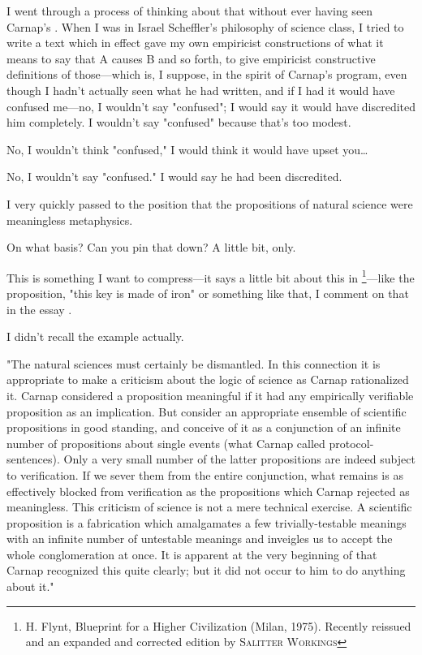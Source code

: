 I went through a process of thinking about that without ever 
having seen Carnap's . When I 
was in Israel Scheffler's philosophy of science class, I tried to write a 
text which in effect gave my own empiricist constructions of what it 
means to say that A causes B and so forth, to give empiricist constructive 
definitions of those---which is, I suppose, in the spirit of Carnap's 
program, even though I hadn't actually seen what he had written, and if 
I had it would have confused me---no, I wouldn't say "confused"; I 
would say it would have discredited him completely. I wouldn't say 
"confused" because that's too modest. 

 No, I wouldn't think "confused," I would think it would 
have upset you\ldots

 No, I wouldn't say "confused." I would say he had been 
discredited. 

I very quickly passed to the position that the propositions of 
natural science were meaningless metaphysics. 

 On what basis? Can you pin that down? A little bit, only. 

 This is something I want to compress---it says a little bit about 
this in \footnote{H. Flynt, Blueprint for a Higher Civilization (Milan, 1975). Recently reissued and an expanded and corrected edition by \textsc{Salitter Workings}}---like 
the proposition, "this key is made of iron" or something like that, I comment on that in the 
essay .

 I didn't recall the example actually. 

 "The natural sciences must certainly be dismantled. 
In this connection it is appropriate to make a criticism about the logic 
of science as Carnap rationalized it. Carnap considered a proposition 
meaningful if it had any empirically verifiable proposition as an 
implication. But consider an appropriate ensemble of scientific propositions 
in good standing, and conceive of it as a conjunction of an infinite 
number of propositions about single events (what Carnap called 
protocol-sentences). Only a very small number of the latter propositions 
are indeed subject to verification. If we sever them from the entire 
conjunction, what remains is as effectively blocked from verification as 
the propositions which Carnap rejected as meaningless. This criticism 
of science is not a mere technical exercise. A scientific proposition is a 
fabrication which amalgamates a few trivially-testable meanings with 
an infinite number of untestable meanings and inveigles us to accept the 
whole conglomeration at once. It is apparent at the very beginning of 
 that Carnap recognized this quite 
clearly; but it did not occur to him to do anything about it." 

